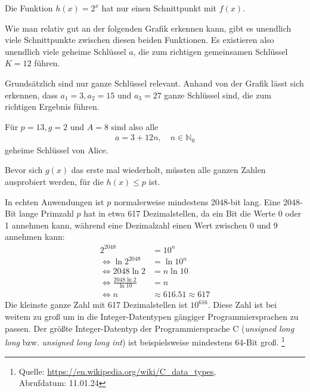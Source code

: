 \documentclass[twocolumn]{report}
\begin{document}
Die Funktion $h(x)=2^x$ hat nur einen Schnittpunkt mit $f(x)$.

Wie man relativ gut an der folgenden Grafik erkennen kann,
gibt es unendlich viele Schnittpunkte zwischen diesen beiden
Funktionen. Es existieren also unendlich viele geheime Schlüssel $a$,
die zum richtigen gemeinsamen Schlüssel $K=12$ führen.

\begin{center}
\end{center}
Grundsätzlich sind nur ganze Schlüssel relevant.
Anhand von der Grafik lässt sich erkennen, dass
$a_1=3,a_2=15$ und $a_3=27$ ganze Schlüssel sind,
die zum richtigen Ergebnis führen.

Für $p=13,g=2$ und $A=8$ sind also alle
\begin{align}
    a=3+12n,\quad n\in\mathbb{N}_0  
\end{align}
geheime Schlüssel von Alice.

Bevor sich $g(x)$ das erste mal wiederholt, müssten alle ganzen Zahlen
ausprobiert werden, für die $h(x)\leq p$ ist.

In echten Anwendungen ist $p$ normalerweise mindestens
2048-bit lang.
Eine 2048-Bit lange Primzahl $p$ hat in etwa 617 Dezimalstellen, da
ein Bit die Werte 0 oder 1 annehmen kann, während eine Dezimalzahl
einen Wert zwischen 0 und 9 annehmen kann:
\begin{align}
    2^{2048}&=10^n \\
    \Leftrightarrow \ln{2^{2048}}&=\ln{10^n} \\
    \Leftrightarrow 2048\ln{2}&=n\ln{10} \\
    \Leftrightarrow \frac{2048\ln{2}}{\ln{10}}&=n \\
    \Leftrightarrow n &\approx 616.51 \approx 617
\end{align}
Die kleinste ganze Zahl mit 617 Dezimalstellen ist $10^{616}$.
Diese Zahl ist bei weitem zu groß um in die Integer-Datentypen
gängiger Programmiersprachen zu passen.
Der größte Integer-Datentyp der Programmiersprache C (\textit{unsigned long long} bzw.
\textit{unsigned long long int}) ist beispielsweise
mindestens 64-Bit groß.
\footnote{Quelle: \url{https://en.wikipedia.org/wiki/C_data_types},\\
Abrufdatum: 11.01.24}
\end{document}
